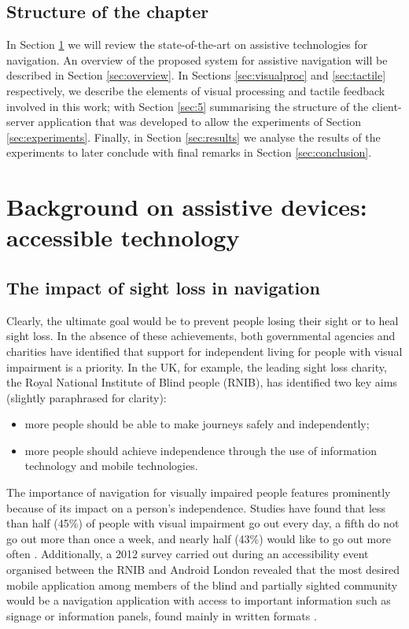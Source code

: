 \subsection{Structure of the chapter}

In Section \ref{sec:2} we will review the state-of-the-art on assistive technologies for navigation. An overview of the proposed system for assistive navigation will be described in Section \ref{sec:overview}. In Sections \ref{sec:visualproc} and \ref{sec:tactile} respectively, we describe the elements of visual processing and tactile feedback involved in this work; with Section \ref{sec:5} summarising the structure of the client-server application that was developed to allow the experiments of Section \ref{sec:experiments}. Finally, in Section \ref{sec:results} we analyse the results of the experiments to later conclude with final remarks in Section \ref{sec:conclusion}.

\section{Background on assistive devices: accessible technology}
\label{sec:2}

\subsection{The impact of sight loss in navigation}

Clearly, the ultimate goal would be to prevent people losing their sight or to heal sight loss. In the absence of these achievements, both governmental agencies and charities have identified that support for independent living for people with visual impairment is a priority. In the UK, for example, the leading sight loss charity, the Royal National Institute of Blind people (RNIB), has identified two key aims \citep{RNIB2009} (slightly paraphrased for clarity): 
\begin{itemize}
\item more people should be able to make journeys safely and independently; 
\item more people should achieve independence through the use of information technology and mobile technologies.
\end{itemize}

The importance of navigation for visually impaired people features prominently because of its impact on a person's independence. Studies have found that less than half (45\%) of people with visual impairment go out every day, a fifth do not go out more than once a week, and nearly half (43\%) would like to go out more often \citep{douglas2006network, RNIB2009}.   Additionally, a 2012 survey carried out during an accessibility event organised between the RNIB and Android London revealed that the most desired mobile application among members of the blind and partially sighted community would be a navigation application with access to important information such as signage or information panels, found mainly in written formats \citep{RNIB2012}. 

